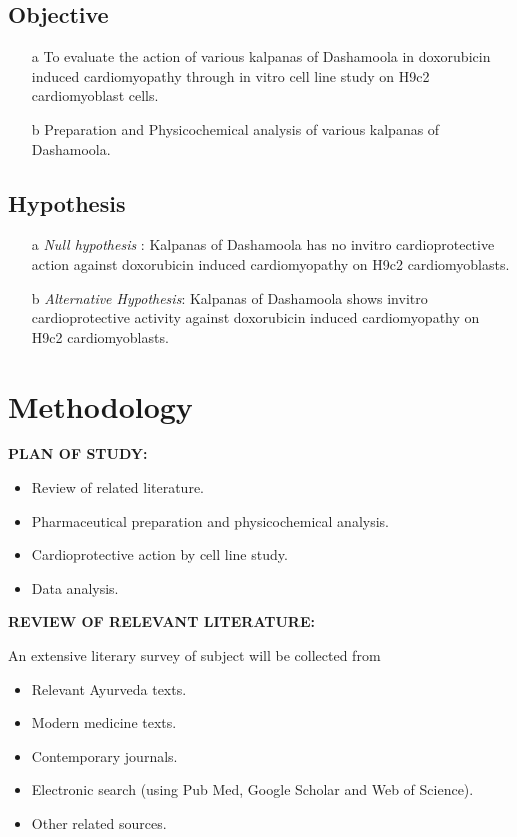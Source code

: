 \documentclass[11pt]{article} %
\begin{document}
\subsection{Objective}
\label{subsec:Objective}


\begin{enumerate}
	\item[a] To evaluate the action of various kalpanas of Dashamoola in doxorubicin induced
	cardiomyopathy through in vitro cell line study on H9c2 cardiomyoblast cells.
	\item[b] Preparation and Physicochemical analysis of various kalpanas of Dashamoola.
\end{enumerate}


\subsection{Hypothesis}
\label{subsec:Hypothesis}

\begin{enumerate}
	\item[a] \textit{Null hypothesis} :
	Kalpanas of Dashamoola has no invitro cardioprotective action against doxorubicin induced
	cardiomyopathy on H9c2 cardiomyoblasts.
	\item[b] \textit{Alternative Hypothesis}: 
	Kalpanas of Dashamoola shows invitro cardioprotective activity against doxorubicin induced
	cardiomyopathy on H9c2 cardiomyoblasts.
\end{enumerate}


\section{Methodology}
\label{sec:Methodology}

\textbf{PLAN OF STUDY:}

\begin{itemize}
	\item Review of related literature.
	\item Pharmaceutical preparation and physicochemical analysis.
	\item Cardioprotective action by cell line study.
	\item Data analysis.
\end{itemize}

\textbf{REVIEW OF RELEVANT LITERATURE:}

An extensive literary survey of subject will be collected from 

\begin{itemize}
	\item Relevant Ayurveda texts.
	\item Modern medicine texts.
	\item Contemporary journals.
	\item Electronic search (using Pub Med, Google Scholar and Web of Science).
	\item Other related sources.
\end{itemize}
\end{document}
